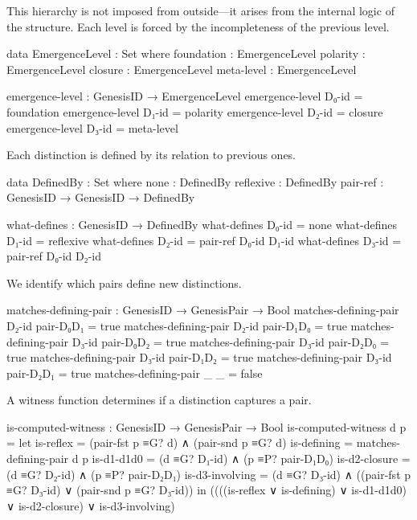 \documentclass[11pt,a4paper]{book}
\begin{document}
This hierarchy is not imposed from outside---it arises from the internal logic of the structure.
Each level is forced by the incompleteness of the previous level.

\begin{code}
data EmergenceLevel : Set where
  foundation : EmergenceLevel
  polarity   : EmergenceLevel
  closure    : EmergenceLevel
  meta-level : EmergenceLevel

emergence-level : GenesisID → EmergenceLevel
emergence-level D₀-id = foundation
emergence-level D₁-id = polarity
emergence-level D₂-id = closure
emergence-level D₃-id = meta-level
\end{code}

Each distinction is defined by its relation to previous ones.

\begin{code}
data DefinedBy : Set where
  none       : DefinedBy
  reflexive  : DefinedBy
  pair-ref   : GenesisID → GenesisID → DefinedBy

what-defines : GenesisID → DefinedBy
what-defines D₀-id = none
what-defines D₁-id = reflexive
what-defines D₂-id = pair-ref D₀-id D₁-id
what-defines D₃-id = pair-ref D₀-id D₂-id
\end{code}

We identify which pairs define new distinctions.

\begin{code}
matches-defining-pair : GenesisID → GenesisPair → Bool
matches-defining-pair D₂-id pair-D₀D₁ = true
matches-defining-pair D₂-id pair-D₁D₀ = true
matches-defining-pair D₃-id pair-D₀D₂ = true
matches-defining-pair D₃-id pair-D₂D₀ = true
matches-defining-pair D₃-id pair-D₁D₂ = true
matches-defining-pair D₃-id pair-D₂D₁ = true
matches-defining-pair _     _         = false
\end{code}

A witness function determines if a distinction captures a pair.

\begin{code}
is-computed-witness : GenesisID → GenesisPair → Bool
is-computed-witness d p = 
  let is-reflex = (pair-fst p ≡G? d) ∧ (pair-snd p ≡G? d)
      is-defining = matches-defining-pair d p
      is-d1-d1d0 = (d ≡G? D₁-id) ∧ (p ≡P? pair-D₁D₀)
      is-d2-closure = (d ≡G? D₂-id) ∧ (p ≡P? pair-D₂D₁)
      is-d3-involving = (d ≡G? D₃-id) ∧ ((pair-fst p ≡G? D₃-id) ∨ (pair-snd p ≡G? D₃-id))
  in ((((is-reflex ∨ is-defining) ∨ is-d1-d1d0) ∨ is-d2-closure) ∨ is-d3-involving)
\end{code}
\end{document}
